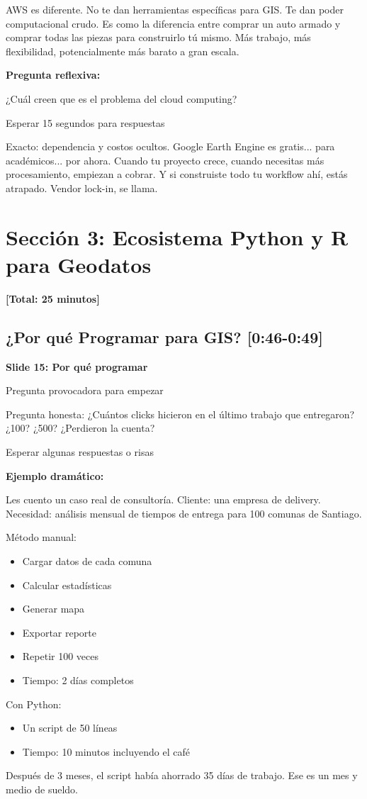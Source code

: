 \documentclass[11pt,a4paper]{article}
\newcommand{\tiempo}[1]{\textcolor{timecolor}{\faIcon{clock} \textbf{[#1]}}}
\newcommand{\decir}[1]{\begin{tcolorbox}[colback=blue!5,colframe=usachblue,title={\faIcon{microphone} DECIR}]#1\end{tcolorbox}}
\newcommand{\hacer}[1]{\begin{tcolorbox}[colback=green!5,colframe=green!50!black,title={\faIcon{hand-point-right} HACER}]#1\end{tcolorbox}}
\begin{document}
\decir{AWS es diferente. No te dan herramientas específicas para GIS. Te dan poder computacional crudo. Es como la diferencia entre comprar un auto armado y comprar todas las piezas para construirlo tú mismo. Más trabajo, más flexibilidad, potencialmente más barato a gran escala.}

\textbf{Pregunta reflexiva:}

\decir{¿Cuál creen que es el problema del cloud computing?}

\hacer{Esperar 15 segundos para respuestas}

\decir{Exacto: dependencia y costos ocultos. Google Earth Engine es gratis... para académicos... por ahora. Cuando tu proyecto crece, cuando necesitas más procesamiento, empiezan a cobrar. Y si construiste todo tu workflow ahí, estás atrapado. Vendor lock-in, se llama.}

\newpage

\section{Sección 3: Ecosistema Python y R para Geodatos}

\tiempo{Total: 25 minutos}

\subsection{¿Por qué Programar para GIS? \tiempo{0:46-0:49}}

\textbf{Slide 15: Por qué programar}

\hacer{Pregunta provocadora para empezar}

\decir{Pregunta honesta: ¿Cuántos clicks hicieron en el último trabajo que entregaron? ¿100? ¿500? ¿Perdieron la cuenta?}

\hacer{Esperar algunas respuestas o risas}

\textbf{Ejemplo dramático:}

\decir{Les cuento un caso real de consultoría. Cliente: una empresa de delivery. Necesidad: análisis mensual de tiempos de entrega para 100 comunas de Santiago. 

Método manual:
\begin{itemize}
    \item Cargar datos de cada comuna
    \item Calcular estadísticas
    \item Generar mapa
    \item Exportar reporte
    \item Repetir 100 veces
    \item Tiempo: 2 días completos
\end{itemize}

Con Python:
\begin{itemize}
    \item Un script de 50 líneas
    \item Tiempo: 10 minutos incluyendo el café
\end{itemize}

Después de 3 meses, el script había ahorrado 35 días de trabajo. Ese es un mes y medio de sueldo.}
\end{document}
